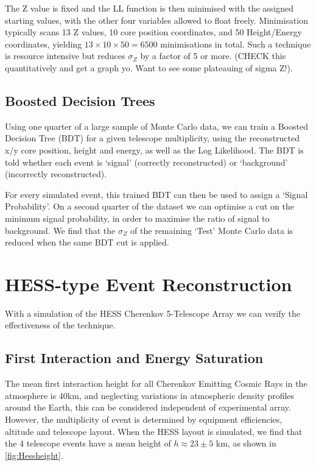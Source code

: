 \documentclass{article}
\begin{document}
The Z value is fixed and the LL function is then minimised with the assigned starting values, with the other four variables allowed to float freely. Minimisation typically scans 13 Z values, 10 core position coordinates, and 50 Height/Energy coordinates, yielding $ 13 \times 10 \times 50 = 6500$ minimisations in total. Such a technique is resource intensive but reduces $\sigma_{Z}$ by a factor of 5 or more. (CHECK this quantitatively and get a graph yo. Want to see some plateauing of sigma Z!).

\subsection{Boosted Decision Trees}
Using one quarter of a large sample of Monte Carlo data, we can train a Boosted Decision Tree (BDT) for a given telescope multiplicity, using the reconstructed x/y core position, height and energy, as well as the Log Likelihood. The BDT is told whether each event is \textquoteleft signal' (correctly reconstructed) or \textquoteleft background' (incorrectly reconstructed). 

For every simulated event, this trained BDT can then be used to assign a \textquoteleft Signal Probability'. On a second quarter of the dataset we can optimise a cut on the minimum signal probability, in order to maximise the ratio of signal to background. We find that the $\sigma_{Z}$ of the remaining \textquoteleft Test' Monte Carlo data is reduced when the same BDT cut is applied.

\section{HESS-type Event Reconstruction}
With a simulation of the HESS Cherenkov 5-Telescope Array we can verify the effectiveness of the technique. 
\subsection{First Interaction and Energy Saturation}
The mean first interaction height for all Cherenkov Emitting Cosmic Rays in the atmosphere is 40km, and neglecting variations in atmospheric density profiles around the Earth, this can be considered independent of experimental array. However, the multiplicity of event is determined by equipment efficiencies, altitude and telescope layout. When the HESS layout is simulated, we find that the 4 telescope events have a mean height of $h \approx 23 \pm 5$ km, as shown in \ref{fig:Hessheight}.
\end{document}
